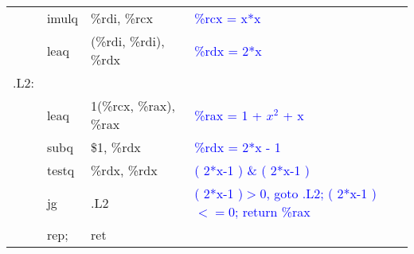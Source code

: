 \documentclass{article}
\newcommand{\blue}[1]{\textcolor{blue}{#1}}
\begin{document}
\begin{CJK}{UTF8}{gbsn}
\begin{table}[ht]
\begin{tabular}{m{1em}m{3em}m{12em}l}
	&	imulq	&	\%rdi, \%rcx	&	\blue{\%rcx = x*x}	\\
	&	leaq	&	(\%rdi, \%rdi), \%rdx	&	\blue{\%rdx = 2*x}	\\
	.L2:	\\
	&	leaq	&	1(\%rcx, \%rax), \%rax	&	\blue{\%rax = 1 + $x^2$ + x}	\\
	&	subq	&	\$1, \%rdx		&	\blue{\%rdx = 2*x - 1}	\\
	&	testq	&	\%rdx, \%rdx		&	\blue{( 2*x-1 ) \& ( 2*x-1 )}	\\
	&	jg	&	.L2			&	\blue{( 2*x-1 )$>$0, goto .L2; ( 2*x-1 )$<=0$; return \%rax }	\\
	&	rep;	&	ret			&	\blue{}	\\
\end{tabular}
\end{table}	\\



\end{CJK}
\end{document}

